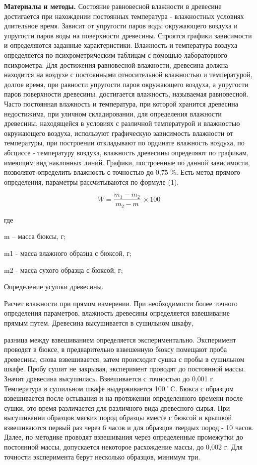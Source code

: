 \begin{multicols}{2}
{\bfseries Материалы и методы.} Состояние равновесной влажности в древесине
достигается при нахождении постоянных температура - влажностных условиях
длительное время. Зависит от упругости паров воды окружающего воздуха и
упругости паров воды на поверхности древесины. Строятся графики
зависимости и определяются заданные характеристики. Влажность и
температура воздуха определяется по психрометрическим таблицам с помощью
лабораторного психрометра. Для достижения равновесной влажности,
древесина должна находится на воздухе с постоянными относительной
влажностью и температурой, долгое время, при равности упругости паров
окружающего воздуха, а упругости паров поверхности древесины,
достигается влажность, называемая равновесной. Часто постоянная
влажность и температура, при которой хранится древесина недостижима, при
уличном складировании, для определения влажности древесины, находящейся
в условиях с различной температурой и влажностью окружающего воздуха,
используют графическую зависимость влажности от температуры, при
построении откладывают по ординате влажность воздуха, по абсциссе -
температуру воздуха, влажность древесины определяют по графикам, имеющим
вид наклонных линий. Графики, построенные по данной зависимости,
позволяют определить влажность с точностью до 0,75 \%. Есть метод
прямого определения, параметры рассчитываются по формуле (1).
\end{multicols}

\begin{equation}
W = \frac{m_{1} - m_{2}}{m_{2} - m}\  \times 100
\end{equation}

\begin{multicols}{2}
где

m -- масса бюксы, г;

m1 - масса влажного образца с бюксой, г;

m2 - масса сухого образца с бюксой, г;

Определение усушки древесины.

Расчет влажности при прямом измерении. При необходимости более точного
определения параметров, влажность древесины определяется взвешивание
прямым путем. Древесина высушивается в сушильном шкафу,

разница между взвешиванием определяется экспериментально. Эксперимент
проводят в бюксе, в предварительно взвешенную бюксу помещают проба
древесины, снова взвешивается, затем происходит сушка с пробы в
сушильном шкафе. Пробу сушит не закрывая, эксперимент проводят до
постоянной массы. Значит древесина высушилась. Взвешивается с точностью
до 0,001 г. Температура в сушильном шкафе выдерживается 100˚C. Бюкса с
образцом взвешивается после остывания и на протяжении определенного
времени после сушки, это время различается для различного вида
древесного сырья. При высушивании образцов мягких пород образцы вместе с
бюксой и крышкой взвешиваются первый раз через 6 часов и для образцов
твердых пород - 10 часов. Далее, по методике проводят взвешивания через
определенные промежутки до постоянной массы, допускается некоторое
расхождение массы, до 0,002 г. Для точности эксперимента берут несколько
образцов, минимум три.
\end{multicols}

